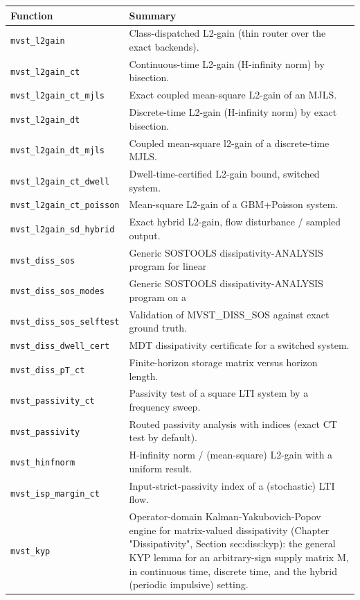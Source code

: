 \documentclass[11pt,oneside]{report}
\newcommand{\code}[1]{\texttt{#1}}
\providecommand{\real}[1]{#1}
\begin{document}
\begin{longtable}[]{@{}
  >{\raggedright\arraybackslash}p{(\columnwidth - 2\tabcolsep) * \real{0.50}}
  >{\raggedright\arraybackslash}p{(\columnwidth - 2\tabcolsep) * \real{0.50}}@{}}
\toprule
Function & Summary \\
\midrule
\endhead
\code{mvst\_l2gain} & Class-dispatched L2-gain (thin router over the exact backends). \\
\code{mvst\_l2gain\_ct} & Continuous-time L2-gain (H-infinity norm) by bisection. \\
\code{mvst\_l2gain\_ct\_mjls} & Exact coupled mean-square L2-gain of an MJLS. \\
\code{mvst\_l2gain\_dt} & Discrete-time L2-gain (H-infinity norm) by exact bisection. \\
\code{mvst\_l2gain\_dt\_mjls} & Coupled mean-square l2-gain of a discrete-time MJLS. \\
\code{mvst\_l2gain\_ct\_dwell} & Dwell-time-certified L2-gain bound, switched system. \\
\code{mvst\_l2gain\_ct\_poisson} & Mean-square L2-gain of a GBM+Poisson system. \\
\code{mvst\_l2gain\_sd\_hybrid} & Exact hybrid L2-gain, flow disturbance / sampled output. \\
\code{mvst\_diss\_sos} & Generic SOSTOOLS dissipativity-ANALYSIS program for linear \\
\code{mvst\_diss\_sos\_modes} & Generic SOSTOOLS dissipativity-ANALYSIS program on a \\
\code{mvst\_diss\_sos\_selftest} & Validation of MVST\_DISS\_SOS against exact ground truth. \\
\code{mvst\_diss\_dwell\_cert} & MDT dissipativity certificate for a switched system. \\
\code{mvst\_diss\_pT\_ct} & Finite-horizon storage matrix versus horizon length. \\
\code{mvst\_passivity\_ct} & Passivity test of a square LTI system by a frequency sweep. \\
\code{mvst\_passivity} & Routed passivity analysis with indices (exact CT test by default). \\
\code{mvst\_hinfnorm} & H-infinity norm / (mean-square) L2-gain with a uniform result. \\
\code{mvst\_isp\_margin\_ct} & Input-strict-passivity index of a (stochastic) LTI flow. \\
\code{mvst\_kyp} & Operator-domain Kalman-Yakubovich-Popov engine for matrix-valued dissipativity (Chapter "Dissipativity", Section sec:diss:kyp): the general KYP lemma for an arbitrary-sign supply matrix M, in continuous time, discrete time, and the hybrid (periodic impulsive) setting. \\

\end{longtable}
\end{document}
